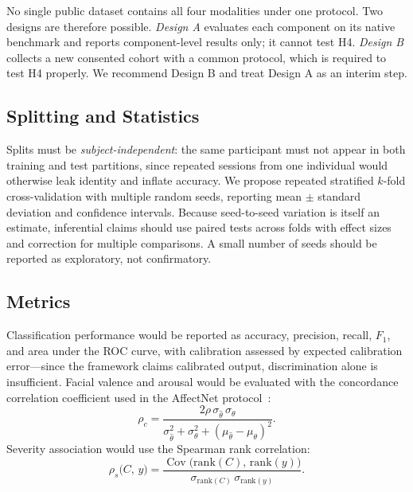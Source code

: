 \documentclass[12pt]{article}
\begin{document}
No single public dataset contains all four modalities under one
protocol. Two designs are therefore possible. \emph{Design A} evaluates
each component on its native benchmark and reports component-level
results only; it cannot test H4. \emph{Design B} collects a new consented
cohort with a common protocol, which is required to test H4 properly.
We recommend Design B and treat Design A as an interim step.

\subsection{Splitting and Statistics}

Splits must be \emph{subject-independent}: the same participant must not
appear in both training and test partitions, since repeated sessions
from one individual would otherwise leak identity and inflate accuracy.
We propose repeated stratified $k$-fold cross-validation with multiple
random seeds, reporting mean $\pm$ standard deviation and confidence
intervals. Because seed-to-seed variation is itself an estimate,
inferential claims should use paired tests across folds with effect
sizes and correction for multiple comparisons. A small number of seeds
should be reported as exploratory, not confirmatory.

\subsection{Metrics}

Classification performance would be reported as accuracy, precision,
recall, $F_1$, and area under the ROC curve, with calibration assessed
by expected calibration error---since the framework claims calibrated
output, discrimination alone is insufficient. Facial valence and arousal
would be evaluated with the concordance correlation coefficient used in
the AffectNet protocol~\cite{mollahosseini2017affectnet}:
\begin{equation}
\rho_c =
\frac{2\rho\,\sigma_{\hat{\theta}}\,\sigma_{\theta}}
     {\sigma_{\hat{\theta}}^{2} + \sigma_{\theta}^{2}
      + (\mu_{\hat{\theta}} - \mu_{\theta})^{2}} .
\end{equation}
Severity association would use the Spearman rank correlation:
\begin{equation}
\rho_s\bigl(C,\,y\bigr)
= \frac{\operatorname{Cov}\bigl(\mathrm{rank}(C),\,\mathrm{rank}(y)\bigr)}
       {\sigma_{\mathrm{rank}(C)}\,\sigma_{\mathrm{rank}(y)}} .
\end{equation}
\end{document}
